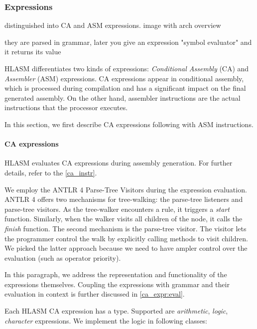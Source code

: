 \subsubsection{Expressions}

distinguished into CA and ASM expressions. 
image with arch
overview

they are parsed in grammar, later you give an expression "symbol evaluator" and it returns its value

HLASM differentiates two kinds of expressions: \emph{Conditional Assembly} (CA) and \emph{Assembler} (ASM) expressions. CA expressions appear in conditional assembly, which is processed during compilation and has a significant impact on the final generated assembly.
On the other hand, assembler instructions are the actual instructions that the processor executes.

In this section, we first describe CA expressions following with ASM instructions.

\paragraph{CA expressions}
\label{ca_expr:logic}
HLASM evaluates CA expressions during assembly generation. For further details, refer to the \cref{ca_instr}.

We employ the ANTLR 4 Parse-Tree Visitors during the expression evaluation. ANTLR 4 offers two mechanisms for tree-walking: the parse-tree listeners and parse-tree visitors. As the tree-walker encounters a rule, it triggers a \emph{start} function. Similarly, when the walker visits all children of the node, it calls the \emph{finish} function.  The second mechanism is the parse-tree visitor. The visitor lets the programmer control the walk by explicitly calling methods to visit children. We picked the latter approach because we need to have ampler control over the evaluation (such as operator priority).

In this paragraph, we address the representation and functionality of the expressions themselves. Coupling the expressions with grammar and their evaluation in context is further discussed in \cref{ca_expr:eval}.

Each HLASM CA expression has a type. Supported are \emph{arithmetic}, \emph{logic}, \emph{character} expressions. We implement the logic in following classes:

